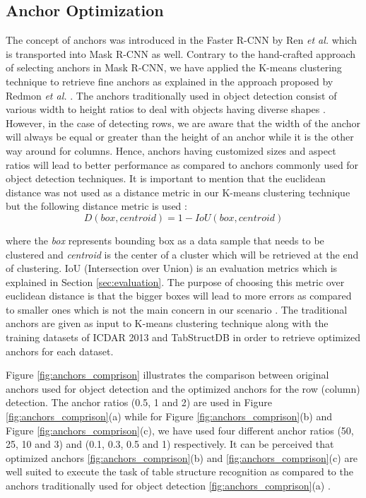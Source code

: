 \documentclass{ieeeaccess}
\begin{document}
\subsection{Anchor Optimization}
The concept of anchors was introduced in the Faster R-CNN by Ren \textit{et al.} \cite{b34} which is transported into Mask R-CNN \cite{b36} as well. Contrary to the hand-crafted approach of selecting anchors in Mask R-CNN, we have applied the K-means clustering technique to retrieve fine anchors as explained in the approach proposed by Redmon \textit{et al.} \cite{b51}. The anchors traditionally used in object detection consist of various width to height ratios to deal with objects having diverse shapes \cite{b63}. However, in the case of detecting rows, we are aware that the width of the anchor will always be equal or greater than the height of an anchor while it is the other way around for columns. Hence, anchors having customized sizes and aspect ratios will lead to better performance as compared to anchors commonly used for object detection techniques. It is important to mention that the euclidean distance  was not used as a distance metric in our K-means clustering technique but the following distance metric \cite{b56} is used :
\begin{equation}
\label{eq:dist}
D(box,centroid) = 1 - IoU(box,centroid)
\end{equation}


where the \textit{box} represents bounding box as a data sample that needs to be clustered and \textit{centroid} is the center of a cluster which will be retrieved at the end of clustering. IoU (Intersection over Union) is an evaluation metrics which is explained in Section \ref{sec:evaluation}. The purpose of choosing this metric over euclidean distance is that the bigger boxes will lead to more errors as compared to smaller ones which is not the main concern in our scenario \cite{b56}. The traditional anchors are given as input to K-means clustering technique along with the training datasets of ICDAR 2013 \cite{b18} and TabStructDB  \cite{b33} in order to retrieve optimized anchors for each dataset. 

Figure \ref{fig:anchors_comprison} illustrates the comparison between original anchors used for object detection and the optimized anchors for the row (column) detection. The anchor ratios (0.5, 1 and 2) are used in Figure \ref{fig:anchors_comprison}(a) while for Figure \ref{fig:anchors_comprison}(b) and Figure \ref{fig:anchors_comprison}(c), we have used four different anchor ratios (50, 25, 10 and 3) and (0.1, 0.3, 0.5 and 1) respectively. It can be perceived that optimized anchors \ref{fig:anchors_comprison}(b) and \ref{fig:anchors_comprison}(c)  are well suited to execute the task of table structure recognition as compared to the anchors traditionally used for object detection \ref{fig:anchors_comprison}(a) .
\end{document}
